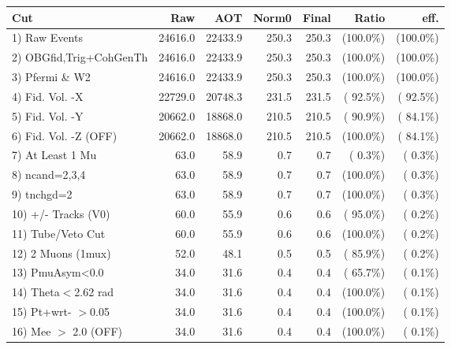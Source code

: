  \begin{table}[h!]\centering
 \begin{tabular}{||l||r|r|r|r|r|r||}
 \hline
 \hline
 Cut & Raw & AOT & Norm0 & Final & Ratio & eff.       \\
 \hline
  1) Raw Events           &      24616.0 &      22433.9 &        250.3 &        250.3 & (100.0\%) & (100.0\%) \\
  2) OBGfid,Trig+CohGenTh &      24616.0 &      22433.9 &        250.3 &        250.3 & (100.0\%) & (100.0\%) \\
  3) Pfermi \& W2         &      24616.0 &      22433.9 &        250.3 &        250.3 & (100.0\%) & (100.0\%) \\
  4) Fid. Vol. -X         &      22729.0 &      20748.3 &        231.5 &        231.5 & ( 92.5\%) & ( 92.5\%) \\
  5) Fid. Vol. -Y         &      20662.0 &      18868.0 &        210.5 &        210.5 & ( 90.9\%) & ( 84.1\%) \\
  6) Fid. Vol. -Z (OFF)   &      20662.0 &      18868.0 &        210.5 &        210.5 & (100.0\%) & ( 84.1\%) \\
  7) At Least 1 Mu        &         63.0 &         58.9 &          0.7 &          0.7 & (  0.3\%) & (  0.3\%) \\
  8) ncand=2,3,4          &         63.0 &         58.9 &          0.7 &          0.7 & (100.0\%) & (  0.3\%) \\
  9) tnchgd=2             &         63.0 &         58.9 &          0.7 &          0.7 & (100.0\%) & (  0.3\%) \\
 10) +/- Tracks (V0)      &         60.0 &         55.9 &          0.6 &          0.6 & ( 95.0\%) & (  0.2\%) \\
 11) Tube/Veto Cut        &         60.0 &         55.9 &          0.6 &          0.6 & (100.0\%) & (  0.2\%) \\
 12) 2 Muons (1mux)       &         52.0 &         48.1 &          0.5 &          0.5 & ( 85.9\%) & (  0.2\%) \\
 13) PmuAsym<0.0          &         34.0 &         31.6 &          0.4 &          0.4 & ( 65.7\%) & (  0.1\%) \\
 14) Theta$<$2.62 rad     &         34.0 &         31.6 &          0.4 &          0.4 & (100.0\%) & (  0.1\%) \\
 15) Pt+wrt- $>$0.05      &         34.0 &         31.6 &          0.4 &          0.4 & (100.0\%) & (  0.1\%) \\
 16) Mee $>$ 2.0  (OFF)   &         34.0 &         31.6 &          0.4 &          0.4 & (100.0\%) & (  0.1\%) \\

\end{tabular}
\end{table}
